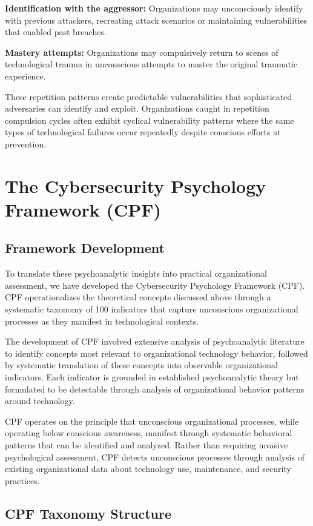\documentclass[10pt, twocolumn]{article}
\begin{document}
\textbf{Identification with the aggressor:} Organizations may unconsciously identify with previous attackers, recreating attack scenarios or maintaining vulnerabilities that enabled past breaches.

\textbf{Mastery attempts:} Organizations may compulsively return to scenes of technological trauma in unconscious attempts to master the original traumatic experience.

These repetition patterns create predictable vulnerabilities that sophisticated adversaries can identify and exploit. Organizations caught in repetition compulsion cycles often exhibit cyclical vulnerability patterns where the same types of technological failures occur repeatedly despite conscious efforts at prevention.

\section{The Cybersecurity Psychology Framework (CPF)}

\subsection{Framework Development}

To translate these psychoanalytic insights into practical organizational assessment, we have developed the Cybersecurity Psychology Framework (CPF). CPF operationalizes the theoretical concepts discussed above through a systematic taxonomy of 100 indicators that capture unconscious organizational processes as they manifest in technological contexts.

The development of CPF involved extensive analysis of psychoanalytic literature to identify concepts most relevant to organizational technology behavior, followed by systematic translation of these concepts into observable organizational indicators. Each indicator is grounded in established psychoanalytic theory but formulated to be detectable through analysis of organizational behavior patterns around technology.

CPF operates on the principle that unconscious organizational processes, while operating below conscious awareness, manifest through systematic behavioral patterns that can be identified and analyzed. Rather than requiring invasive psychological assessment, CPF detects unconscious processes through analysis of existing organizational data about technology use, maintenance, and security practices.

\subsection{CPF Taxonomy Structure}
\end{document}
